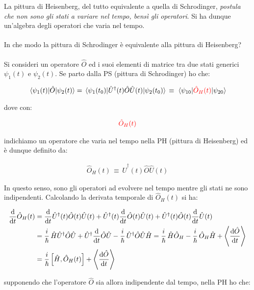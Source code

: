 	La pittura di Heisenberg, del tutto equivalente a quella di Schrodinger, \textit{postula che non sono gli stati a variare nel tempo, bensì gli operatori}. Si ha dunque un'algebra degli operatori che varia nel tempo. 
	\\
	\\
	In che modo la pittura di Schrodinger è equivalente alla pittura di Heisenberg?
	\\
	\\
	Si consideri un operatore $\hat{O}$ ed i suoi elementi di matrice tra due stati generici $\psi_1(t)$ e $\psi_2(t)$. Se parto dalla PS (pittura di Schrodinger) ho che:
	
\begin{align*}
	\mel{\psi_1(t)}{\hat{O}}{\psi_2(t)} = \mel*{\psi_1(t_0)}{\hat{U}^{\dagger}(t)\hat{O}\hat{U}(t)}{\psi_2(t_0)} \, \equiv \, \mel{\psi_{10}}{\textcolor{red}{\hat{O}_H(t)}}{\psi_{20}}
\end{align*}

	dove con: 
	
\begin{align*}
	\textcolor{red}{\hat{O}_H(t)}
\end{align*}

	indichiamo un operatore che varia nel tempo nella PH (pittura di Heisenberg) ed è dunque definito da:

\begin{align*}
	\hat{O}_H(t) \, \equiv \, \hat{U}^{\dagger}(t)\hat{O}\hat{U}(t)
\end{align*}

	In questo senso, sono gli operatori ad evolvere nel tempo mentre gli stati ne sono indipendenti. Calcolando la derivata temporale di $\hat{O}_H(t)$ si ha:
	
\begin{align*}
	\dv{t} \hat{O}_H(t) &= \dv{t} \hat{U}^{\dagger}(t)\hat{O}(t)\hat{U}(t) + \hat{U}^{\dagger}(t) \dv{t}\hat{O}(t)\hat{U}(t) + \hat{U}^{\dagger}(t)\hat{O}(t)\dv{t} \hat{U}(t)\\
	& = \frac{i}{\hbar} \, \hat{H} \hat{U}^{\dagger}\hat{O}\hat{U} + \hat{U}^{\dagger} \dv{t}\hat{O} \hat{U} - \frac{i}{\hbar} \, \hat{U}^{\dagger}\hat{O}\hat{U}\hat{H} = \frac{i}{\hbar} \, \hat{H}\hat{O}_H - \frac{i}{\hbar} \, \hat{O}_H \hat{H} + \left\langle \dv{\hat{O}}{t} \right\rangle \\
	& = \frac{i}{\hbar} \, \qty[\hat{H}, \hat{O}_H(t)] + \left\langle \dv{\hat{O}}{t} \right\rangle 
\end{align*}

	supponendo che l'operatore $\hat{O}$ sia allora indipendente dal tempo, nella PH ho che:

